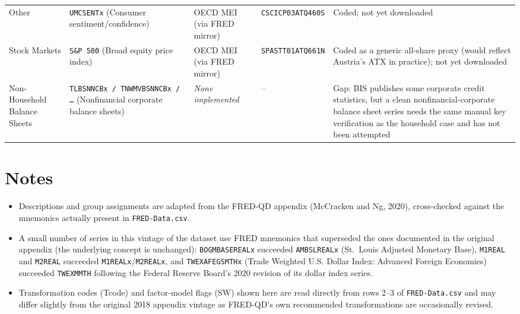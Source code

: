\documentclass[11pt]{article}
\begin{document}
\begin{landscape}
\begin{longtable}{L{3cm} L{4.3cm} L{3.2cm} L{3.8cm} L{6.2cm}}
Other & \texttt{UMCSENTx} (Consumer sentiment/confidence) & OECD MEI (via FRED mirror) & \texttt{CSCICP03ATQ460S} & Coded; not yet downloaded \\
Stock Markets & \texttt{S\&P 500} (Broad equity price index) & OECD MEI (via FRED mirror) & \texttt{SPASTT01ATQ661N} & Coded as a generic all-share proxy (would reflect Austria's ATX in practice); not yet downloaded \\
Non-Household Balance Sheets & \texttt{TLBSNNCBx / TNWMVBSNNCBx / \ldots} (Nonfinancial corporate balance sheets) & \emph{None implemented} & -- & Gap: BIS publishes some corporate credit statistics, but a clean nonfinancial-corporate balance sheet series needs the same manual key verification as the household case and has not been attempted \\
\bottomrule
\end{longtable}

\end{landscape}

\section*{Notes}

\begin{itemize}
  \item Descriptions and group assignments are adapted from the FRED-QD
    appendix (McCracken and Ng, 2020), cross-checked against the mnemonics
    actually present in \texttt{FRED-Data.csv}.
  \item A small number of series in this vintage of the dataset use FRED
    mnemonics that superseded the ones documented in the original appendix
    (the underlying concept is unchanged): \texttt{BOGMBASEREALx} succeeded
    \texttt{AMBSLREALx} (St.\ Louis Adjusted Monetary Base), \texttt{M1REAL}
    and \texttt{M2REAL} succeeded \texttt{M1REALx}/\texttt{M2REALx}, and
    \texttt{TWEXAFEGSMTHx} (Trade Weighted U.S. Dollar Index: Advanced
    Foreign Economies) succeeded \texttt{TWEXMMTH} following the Federal
    Reserve Board's 2020 revision of its dollar index series.
  \item Transformation codes (Tcode) and factor-model flags (SW) shown here
    are read directly from rows 2--3 of \texttt{FRED-Data.csv} and may differ
    slightly from the original 2018 appendix vintage as FRED-QD's own
    recommended transformations are occasionally revised.
\end{itemize}
\end{document}
